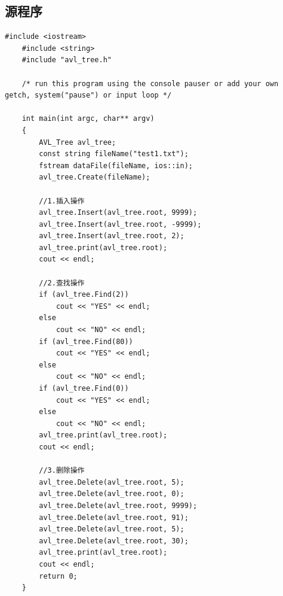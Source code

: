 \documentclass[a4paper,11pt,UTF8]{ctexart}
\begin{document}
\subsection{源程序}
\begin{lstlisting}[caption=main.cpp,captionpos=b]
    #include <iostream>
    #include <string>
    #include "avl_tree.h"

    /* run this program using the console pauser or add your own getch, system("pause") or input loop */

    int main(int argc, char** argv)
    {
        AVL_Tree avl_tree;
        const string fileName("test1.txt");
        fstream dataFile(fileName, ios::in);
        avl_tree.Create(fileName);

        //1.插入操作
        avl_tree.Insert(avl_tree.root, 9999);
        avl_tree.Insert(avl_tree.root, -9999);
        avl_tree.Insert(avl_tree.root, 2);
        avl_tree.print(avl_tree.root);
        cout << endl;

        //2.查找操作
        if (avl_tree.Find(2))
            cout << "YES" << endl;
        else
            cout << "NO" << endl;
        if (avl_tree.Find(80))
            cout << "YES" << endl;
        else
            cout << "NO" << endl;
        if (avl_tree.Find(0))
            cout << "YES" << endl;
        else
            cout << "NO" << endl;
        avl_tree.print(avl_tree.root);
        cout << endl;

        //3.删除操作
        avl_tree.Delete(avl_tree.root, 5);
        avl_tree.Delete(avl_tree.root, 0);
        avl_tree.Delete(avl_tree.root, 9999);
        avl_tree.Delete(avl_tree.root, 91);
        avl_tree.Delete(avl_tree.root, 5);
        avl_tree.Delete(avl_tree.root, 30);
        avl_tree.print(avl_tree.root);
        cout << endl;
        return 0;
    }
\end{lstlisting}
\end{document}
